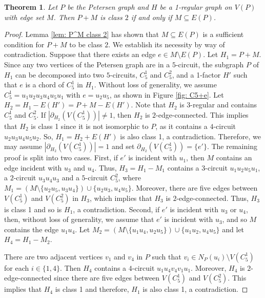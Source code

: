 \documentclass[a4paper,11pt]{article}
\newtheorem{theo}[defi]{Theorem}
\theoremstyle{remark}
\begin{document}
\begin{theo}\label{theo:P+matching}
	Let $P$ be the Petersen graph and $H$ be a 1-regular graph on 
	$V(P)$ with edge set $M$. Then $P+M$ is class $2$ if and only if $M\subseteq E(P)$.
\end{theo}
\begin{proof} Lemma  \ref{lem: P^M class 2} has shown that $M\subseteq E(P)$ is a sufficient condition for $P+M$  to be class $ 2 $. We establish its necessity by way of contradiction. Suppose that there exists an edge  $ e \in M\setminus E(P) $. Let $ H_1=P+M$.
Since any two  vertices of the Petersen graph are in a $ 5 $-circuit, the subgraph $ P $ of $ H_1 $ can be decomposed into two $ 5 $-circuits, $ C^1_5 $ and $C^2_5 $, and a 1-factor $H'  $ such that $e$ is a chord of $ C^1_5$ in $ H_1 $. Without loss of generality,  we assume $ C^1_5=u_1u_2u_3u_4u_5u_1$ with $e=u_2u_5$, as shown in Figure \ref{fig: C5+e}. 
	Let $H_2=H_1-E(H')=P+M-E(H')$. Note that $ H_2 $ is $ 3 $-regular and contains $C^1_5$ and $C^2_5$.
	If $| \partial_ {H_2}(V(C^1_5))|\neq1$, then $ H_2 $ is $ 2 $-edge-connected. This implies that $ H_2 $  is class 1 since it is not isomorphic to $P$, as it contains a $ 4 $-circuit $u_2u_3u_4u_5u_2 $. So, $ H_1= H_2+E(H')$ is also class 1, a contradiction.  Therefore, we may assume $| \partial_ {H_2}(V(C^1_5))|=1$ and set $ \partial_ {H_2}(V(C^1_5))=\{e'\} $.  The remaining proof is split into two cases. First, if $ e' $ is incident with $u_1$,
	then $M  $ contains an edge incident with $u_3$ and $ u_4 $.   
	Thus, $H_3=H_1-M_1$ contains a $ 3 $-circuit $u_1u_2u_5u_1$, a $ 2 $-circuit $u_3u_4u_3$ and a $ 5 $-circuit $ C^2_5 $, where $M_1=(M\setminus \{u_2u_5,u_3u_4\})\cup\{u_2u_3,u_4u_5\}$. Moreover, there are five edges between $ V(C^1_5) $ and $ V(C^2_5) $ in $ H_3 $, which implies that $ H_3 $ is $ 2 $-edge-connected. 
	Thus, $ H_3 $ is class 1 and so is $ H_1 $, a contradiction.  Second, 
	if $ e' $ is incident with $ u_3 $ or $ u_4 $, then, without loss of generality, we assume that $ e' $ is incident with $ u_3 $, and so  $M$ contains the edge $u_1u_4$.  Let $M_2=(M\setminus\{u_1u_4,u_2u_5\})\cup\{u_1u_2,u_4u_5\}$ and let $H_4=H_1-M_2$. 
	
There are two adjacent vertices $v_1$ and $v_4$ in $P$ such that $v_i \in N_{P}(u_i)\setminus V(C^1_5)$ for each $i\in\{1,4\}$. Then $H_4$ contains a $ 4 $-circuit $u_1u_4v_4v_1u_1$. Moreover, $ H_4 $ is $ 2 $-edge-connected since there are five edges between $ V(C^1_5) $ and $ V(C^2_5) $.  This implies that $H_4$  is class 1 and therefore, $H_1$ is also class 1, a contradiction. 
\end{proof}
\end{document}
